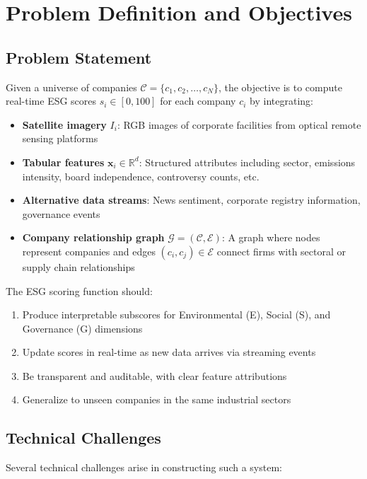 \clearpage
\section{Problem Definition and Objectives}
\label{sec:problem}

\subsection{Problem Statement}

Given a universe of companies $\mathcal{C} = \{c_1, c_2, \ldots, c_N\}$, the objective is to compute real-time ESG scores $s_i \in [0, 100]$ for each company $c_i$ by integrating:

\begin{itemize}
\item \textbf{Satellite imagery} $I_i$: RGB images of corporate facilities from optical remote sensing platforms
\item \textbf{Tabular features} $\mathbf{x}_i \in \mathbb{R}^d$: Structured attributes including sector, emissions intensity, board independence, controversy counts, etc.
\item \textbf{Alternative data streams}: News sentiment, corporate registry information, governance events
\item \textbf{Company relationship graph} $\mathcal{G} = (\mathcal{C}, \mathcal{E})$: A graph where nodes represent companies and edges $(c_i, c_j) \in \mathcal{E}$ connect firms with sectoral or supply chain relationships
\end{itemize}

The ESG scoring function should:
\begin{enumerate}
\item Produce interpretable subscores for Environmental (E), Social (S), and Governance (G) dimensions
\item Update scores in real-time as new data arrives via streaming events
\item Be transparent and auditable, with clear feature attributions
\item Generalize to unseen companies in the same industrial sectors
\end{enumerate}

\subsection{Technical Challenges}

Several technical challenges arise in constructing such a system:

